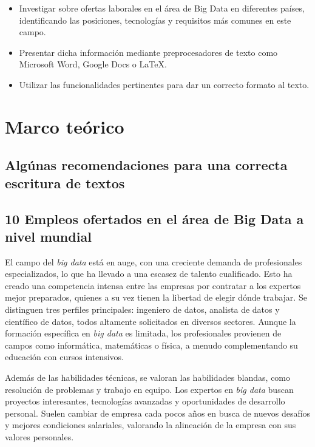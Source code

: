 \documentclass[12pt]{article}
\begin{document}
            \begin{itemize}[label=$\bullet$] 
                \item Investigar sobre ofertas laborales en el área de Big Data en diferentes países, identificando las posiciones, tecnologías y requisitos más comunes en este campo.
                \item Presentar dicha información mediante preprocesadores de texto como Microsoft Word, Google Docs o LaTeX.
                \item Utilizar las funcionalidades pertinentes para dar un correcto formato al texto.
            \end{itemize}
    
            
    \newpage


    \section{Marco teórico}
        
        \subsection{Algúnas recomendaciones para una correcta escritura de textos}

        \subsection{10 Empleos ofertados en el área de Big Data a nivel mundial}
            El campo del \emph{big data} está en auge, con una creciente demanda de profesionales especializados, lo que ha llevado a una escasez de talento cualificado. Esto ha creado una competencia intensa entre las empresas por contratar a los expertos mejor preparados, quienes a su vez tienen la libertad de elegir dónde trabajar. Se distinguen tres perfiles principales: ingeniero de datos, analista de datos y científico de datos, todos altamente solicitados en diversos sectores. Aunque la formación específica en \emph{big data} es limitada, los profesionales provienen de campos como informática, matemáticas o física, a menudo complementando su educación con cursos intensivos.
            
            Además de las habilidades técnicas, se valoran las habilidades blandas, como resolución de problemas y trabajo en equipo. Los expertos en \emph{big data} buscan proyectos interesantes, tecnologías avanzadas y oportunidades de desarrollo personal. Suelen cambiar de empresa cada pocos años en busca de nuevos desafíos y mejores condiciones salariales, valorando la alineación de la empresa con sus valores personales.
            
\end{document}
